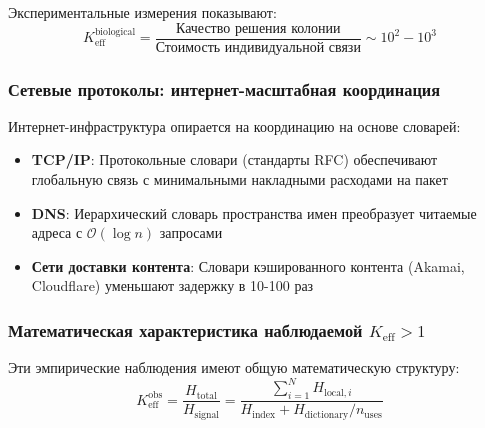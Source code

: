 \documentclass[11pt,a4paper]{article}
\begin{document}
	Экспериментальные измерения показывают:
	\begin{equation}
		K_{\mathrm{eff}}^{\text{biological}} = \frac{\text{Качество решения колонии}}{\text{Стоимость индивидуальной связи}} \sim 10^2 - 10^3
	\end{equation}
	
	\subsubsection{Сетевые протоколы: интернет-масштабная координация}
	Интернет-инфраструктура опирается на координацию на основе словарей:
	\begin{itemize}
		\item \textbf{TCP/IP}: Протокольные словари (стандарты RFC) обеспечивают глобальную связь с минимальными накладными расходами на пакет
		\item \textbf{DNS}: Иерархический словарь пространства имен преобразует читаемые адреса с $\mathcal{O}(\log n)$ запросами
		\item \textbf{Сети доставки контента}: Словари кэшированного контента (Akamai, Cloudflare) уменьшают задержку в 10-100 раз
	\end{itemize}
	
	\subsubsection{Математическая характеристика наблюдаемой $K_{\mathrm{eff}} > 1$}
	Эти эмпирические наблюдения имеют общую математическую структуру:
	\begin{equation}
		K_{\mathrm{eff}}^{\text{obs}} = \frac{H_{\text{total}}}{H_{\text{signal}}} = \frac{\sum_{i=1}^N H_{\text{local}, i}}{H_{\text{index}} + H_{\text{dictionary}}/n_{\text{uses}}}
	\end{equation}
	
\end{document}
